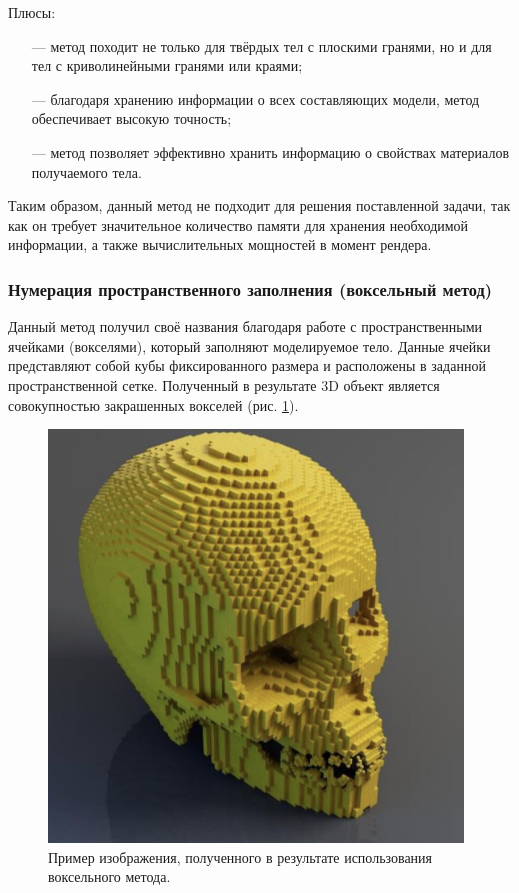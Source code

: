 Плюсы:
\begin{itemize}[leftmargin=1.6\parindent]
	\item[---] метод походит не только для твёрдых тел с плоскими гранями, но и для 
	тел с криволинейными гранями или краями;
	\item[---] благодаря хранению информации о всех составляющих модели, метод 
	обеспечивает высокую точность;
	\item[---] метод позволяет эффективно хранить информацию о свойствах материалов получаемого тела.
\end{itemize}

Таким образом, данный метод не подходит для решения поставленной 
задачи, так как он требует значительное количество памяти для хранения 
необходимой информации, а также вычислительных мощностей в момент 
рендера.

\subsubsection{Нумерация пространственного заполнения (воксельный метод)} \label{sec:numeric}

Данный метод получил своё названия благодаря работе с 
пространственными ячейками (вокселями), который заполняют моделируемое 
тело.
Данные ячейки представляют собой кубы фиксированного размера и 
расположены в заданной пространственной сетке.
Полученный в результате 3D 
объект является совокупностью закрашенных вокселей (рис. \ref{fig:numeric}). 

\begin{figure}[h]
	\centering
	\includegraphics[width=110mm]{img/numeric.png}
	\caption{Пример изображения, полученного в результате 
		использования воксельного метода.}
	\label{fig:numeric}
\end{figure}

